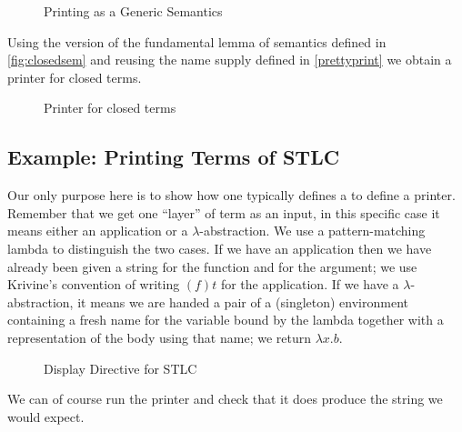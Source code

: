 \begin{figure}[h]
\caption{Printing as a Generic Semantics\label{fig:genprinting}}
\end{figure}

Using the  version of the fundamental lemma of semantics defined in
\cref{fig:closedsem} and reusing the name supply defined in \cref{prettyprint}
we obtain a printer for closed terms.

\begin{figure}[h]
\caption{Printer for closed terms\label{fig:genprinter}}
\end{figure}

\subsection{Example: Printing Terms of STLC}
\label{sec:printingexample}

Our only purpose here is to show how one typically defines a  to
define a printer. Remember that we get one ``layer'' of term as an input, in this
specific case it means either an application or a $\lambda$-abstraction. We use
a pattern-matching lambda to distinguish the two cases. If we have an application
then we have already been given a string  for the function and  for the
argument; we use Krivine's convention of writing $(f)t$ for the application. If we
have a $\lambda$-abstraction, it means we are handed a pair of a (singleton) environment
containing a fresh name  for the variable bound by the lambda together with a
representation  of the body using that name; we return $\lambda{}x.b$.

\begin{figure}[h]
\caption{Display Directive for STLC\label{fig:exampledisplay}}
\end{figure}

We can of course run the printer and check that it does produce the string we would
expect.


